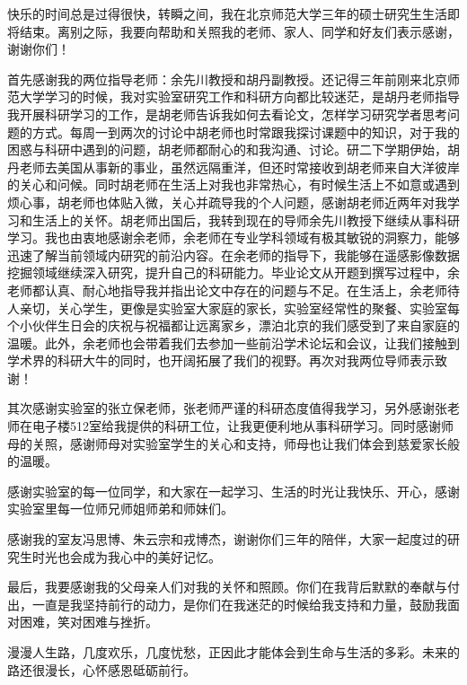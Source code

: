 
\begin{ack}
  快乐的时间总是过得很快，转瞬之间，我在北京师范大学三年的硕士研究生生活即将结束。离别之际，我要向帮助和关照我的老师、家人、同学和好友们表示感谢，谢谢你们！

  首先感谢我的两位指导老师：余先川教授和胡丹副教授。还记得三年前刚来北京师范大学学习的时候，我对实验室研究工作和科研方向都比较迷茫，是胡丹老师指导我开展科研学习的工作，是胡老师告诉我如何去看论文，怎样学习研究学者思考问题的方式。每周一到两次的讨论中胡老师也时常跟我探讨课题中的知识，对于我的困惑与科研中遇到的问题，胡老师都耐心的和我沟通、讨论。研二下学期伊始，胡丹老师去美国从事新的事业，虽然远隔重洋，但还时常接收到胡老师来自大洋彼岸的关心和问候。同时胡老师在生活上对我也非常热心，有时候生活上不如意或遇到烦心事，胡老师也体贴入微，关心并疏导我的个人问题，感谢胡老师近两年对我学习和生活上的关怀。胡老师出国后，我转到现在的导师余先川教授下继续从事科研学习。我也由衷地感谢余老师，余老师在专业学科领域有极其敏锐的洞察力，能够迅速了解当前领域内研究的前沿内容。在余老师的指导下，我能够在遥感影像数据挖掘领域继续深入研究，提升自己的科研能力。毕业论文从开题到撰写过程中，余老师都认真、耐心地指导我并指出论文中存在的问题与不足。在生活上，余老师待人亲切，关心学生，更像是实验室大家庭的家长，实验室经常性的聚餐、实验室每个小伙伴生日会的庆祝与祝福都让远离家乡，漂泊北京的我们感受到了来自家庭的温暖。此外，余老师也会带着我们去参加一些前沿学术论坛和会议，让我们接触到学术界的科研大牛的同时，也开阔拓展了我们的视野。再次对我两位导师表示致谢！

  其次感谢实验室的张立保老师，张老师严谨的科研态度值得我学习，另外感谢张老师在电子楼512室给我提供的科研工位，让我更便利地从事科研学习。同时感谢师母的关照，感谢师母对实验室学生的关心和支持，师母也让我们体会到慈爱家长般的温暖。

  感谢实验室的每一位同学，和大家在一起学习、生活的时光让我快乐、开心，感谢实验室里每一位师兄师姐师弟和师妹们。

  感谢我的室友冯思博、朱云宗和戎博杰，谢谢你们三年的陪伴，大家一起度过的研究生时光也会成为我心中的美好记忆。

  最后，我要感谢我的父母亲人们对我的关怀和照顾。你们在我背后默默的奉献与付出，一直是我坚持前行的动力，是你们在我迷茫的时候给我支持和力量，鼓励我面对困难，笑对困难与挫折。

  漫漫人生路，几度欢乐，几度忧愁，正因此才能体会到生命与生活的多彩。未来的路还很漫长，心怀感恩砥砺前行。

\end{ack}
